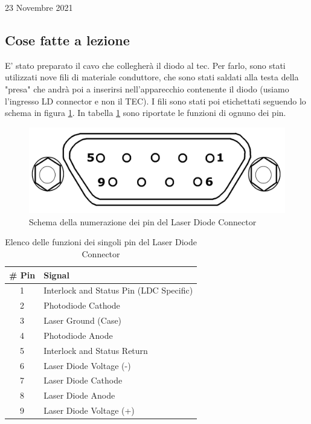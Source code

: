 \documentclass{article}
\numberwithin{equation}{section}
\begin{document}
\begin{section}{23 Novembre 2021}
\subsection{Cose fatte a lezione}
E' stato preparato il cavo che collegherà il diodo al tec. Per farlo, sono stati utilizzati nove fili di materiale conduttore, che sono stati saldati alla testa della "presa" che andrà poi a inserirsi nell'apparecchio contenente il diodo (usiamo l'ingresso LD connector e non il TEC). I fili sono stati poi etichettati seguendo lo schema in figura \ref{fig:pin}. In tabella \ref{tab:pinfunction} sono riportate le funzioni di ognuno dei pin. 
\begin{figure}[h]
    \centering
    \includegraphics[scale=0.3]{pin_scheme.png}
    \caption{Schema della numerazione dei pin del Laser Diode Connector}
    \label{fig:pin}
\end{figure}

\begin{table}[htpb]
    \centering
    \begin{tabular}{c|l}
        \# Pin &	Signal \\
        \hline
        1 &	Interlock and Status Pin (LDC Specific) \\
        2 &	Photodiode Cathode \\
        3 &	Laser Ground (Case) \\
        4 &	Photodiode Anode \\
        5 &	Interlock and Status Return \\
        6 &	Laser Diode Voltage (-) \\
        7 &	Laser Diode Cathode \\
        8 &	Laser Diode Anode \\
        9 &	Laser Diode Voltage (+)
    \end{tabular}
    \caption{Elenco delle funzioni dei singoli pin del Laser Diode Connector}
    \label{tab:pinfunction}
\end{table}


\end{section}
\end{document}
